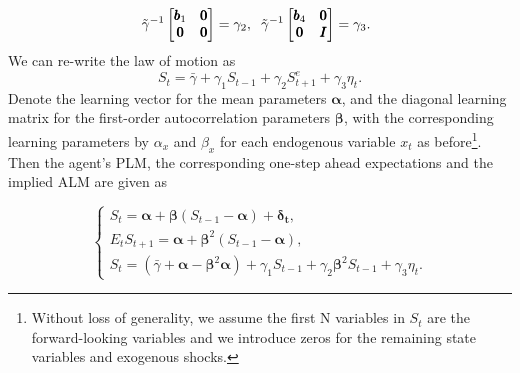 $$\tilde{\gamma}^{-1}\begin{bmatrix} \pmb{b}_1 & \pmb{0} \\ \pmb{0} & \pmb{0} \\ \end{bmatrix} = \gamma_2,\hspace{2 mm}
\tilde{\gamma}^{-1}\begin{bmatrix} \pmb{b}_4 & \pmb{0}\\\pmb{0} & \pmb{I} \end{bmatrix}=\gamma_3.\hspace{2 mm}
 $$ 
We can re-write the law of motion as
\begin{equation}
S_t = \bar{\gamma} + \gamma_1 S_{t-1} + \gamma_2 S_{t+1}^e + \gamma_3 \eta_t.
\label{eqn:2_7}
\end{equation}
Denote the learning vector for the mean parameters $ \pmb{ \alpha }$, and the diagonal learning matrix for the first-order autocorrelation parameters $\pmb{ \beta} $, with the corresponding learning parameters by $ \alpha_{x} $ and $\beta_{x} $ for each endogenous variable $ x_t$ as before\footnote{Without loss of generality, we assume the first N variables in $ S_t$ are the forward-looking variables and we introduce zeros for the remaining state variables and exogenous shocks.}. Then the agent's PLM, the corresponding one-step ahead expectations and the implied ALM are given as 


\begin{equation}
\begin{cases}
S_t = \pmb{\alpha} + \pmb{\beta} ( S_{t-1} - \pmb{\alpha}) + \pmb{\delta_t},\\
 E_t S_{t+1} = \pmb{\alpha} + \pmb{\beta}^2 (S_{t-1} - \pmb{\alpha}),\\
 S_t =(\bar{\gamma}+\pmb{\alpha}-\pmb{\beta}^2 \pmb{ \alpha})+ \gamma_1 S_{t-1} + \gamma_2 \pmb{\beta}^2 S_{t-1} + \gamma_3 \eta_t. \label{eqn:2_9}
 \end{cases}
\end{equation}

